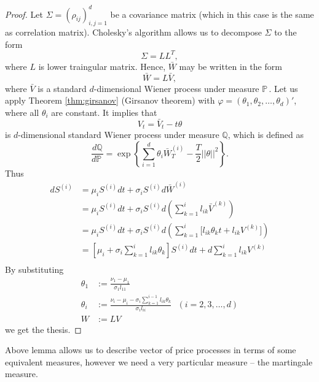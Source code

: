 \documentclass[a4paper,12pt, oneside]{book}
\theoremstyle{definition}
\theoremstyle{remark}
\def\P{{\mathbb{P}}\,}
\begin{document}
\begin{proof}
 Let $\Sigma = (\rho_{ij})_{i,j=1}^d$ be a covariance matrix (which in this case is the same as correlation matrix). Cholesky's algorithm allows us to decompose $\Sigma$ to the form
 \[ \Sigma = LL^T, \]
 where $L$ is lower traingular matrix. Hence, $\bar{W}$ may be written in the form
 \[ \bar{W} = L \bar{V}, \]
 where $\bar{V}$ is a standard $d$-dimensional Wiener process under measure $\P$. Let us apply Theorem \ref{thm:girsanov} (Girsanov theorem) with $\varphi = (\theta_1, \theta_2, \ldots, \theta_d)'$, where all $\theta_i$ are constant. It implies that
 \[ V_t = \bar{V}_t - t\theta \]
 is $d$-dimensional standard Wiener process under measure $\mathbb{Q}$, which is defined as
 \[\frac{d\mathbb{Q}}{d\P} = \exp\left\{ \sum\limits_{i=1}^d \theta_i \bar{W}^{(i)}_T - \frac{T}{2} ||\theta||^2 \right\}.\] Thus
 \begin{equation*}
  \begin{split}
   dS^{(i)} &= \mu_i S^{(i)} dt + \sigma_i S^{(i)} d\bar{W}^{(i)} \\
            &= \mu_i S^{(i)} dt + \sigma_i S^{(i)} d\left(\sum\limits_{k=1}^i l_{ik} \bar{V}^{(k)}\right) \\
            &= \mu_i S^{(i)} dt + \sigma_i S^{(i)} d\left(\sum\limits_{k=1}^i \bigl[ l_{ik}\theta_k t + l_{ik} V^{(k)} \bigr] \right) \\    
            &= \left[ \mu_i + \sigma_i \sum\limits_{k=1}^i l_{ik}\theta_k \right] S^{(i)}dt + d\sum\limits_{k=1}^i l_{ik} V^{(k)} \\      
  \end{split}
 \end{equation*}
 By substituting
 \begin{align*}
  \theta_1 &:= \frac{\nu_1 - \mu_1}{\sigma_1 l_{11}}\\
  \theta_i &:= \frac{\nu_i - \mu_i - \sigma_i \sum\limits_{k=1}^{i-1} l_{ik}\theta_k}{\sigma_il_{ii}}\ \ \ (i=2,3,\ldots,d)\\
         W &:= LV
 \end{align*}
 we get the thesis.
\end{proof}

Above lemma allows us to describe vector of price processes in terms of some equivalent measures, however we need a very particular measure -- the martingale measure.
\end{document}
